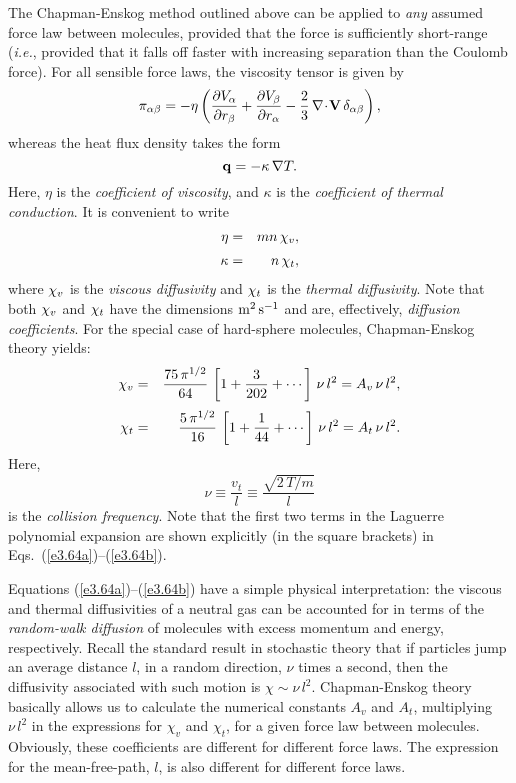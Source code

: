 The Chapman-Enskog method outlined above can be applied to {\em any}\/ assumed
force law between molecules, provided that the force is sufficiently short-range
({\em i.e.}, provided that it falls off faster with increasing 
separation than the Coulomb force). For all sensible force laws, the viscosity
tensor is given by
\begin{equation}\label{e3.61}
\pi_{\alpha\beta} =- \eta \left( \frac{\partial V_\alpha}{\partial r_\beta}
+ \frac{\partial V_\beta}{\partial r_\alpha} - \frac{2}{3}\,\nabla\!\cdot\!{\bf V}\,\delta_{\alpha\beta}
\right),
\end{equation}
whereas the heat flux density takes the form
\begin{equation}\label{e3.62}
{\bf q} = - \kappa\,\nabla T.
\end{equation}
Here, $\eta$ is the {\em coefficient of viscosity}, and $\kappa$ is the
{\em coefficient of thermal conduction}. It is convenient to write
\begin{eqnarray}
\eta &= &m n \,{\mit\chi}_v,\\[0.5ex]
\kappa& =& n\,{\mit\chi}_t,
\end{eqnarray}
where ${\mit\chi}_v$ is the {\em viscous diffusivity}\/ and ${\mit\chi}_t$
is the {\em thermal diffusivity}. Note that both ${\mit\chi}_v$ and
${\mit\chi}_t$ have the dimensions ${\rm m}^2\,{\rm s}^{-1}$ and are,
effectively, {\em diffusion coefficients}. For the special
case of hard-sphere molecules, Chapman-Enskog theory yields:
\begin{eqnarray}\label{e3.64a}
{\mit\chi}_v &=& \frac{75\,\pi^{1/2}}{64}\,\left[1+ \frac{3}{202}
+\cdots\right]\,\nu\,l^2 = A_v\,\nu\,l^2,\\[0.5ex]
{\mit\chi}_t &=& \frac{5\,\pi^{1/2}}{16}\,\left[
1+ \frac{1}{44}+\cdots\right]\,\nu\,l^2 = A_t\,\nu\,l^2.\label{e3.64b}
\end{eqnarray}
Here, 
\begin{equation}\label{e3.65}
\nu \equiv \frac{v_t}{l} \equiv \frac{\sqrt{2\,T/m}}{l}
\end{equation}
is the {\em collision frequency}. Note that the first two terms in the Laguerre
polynomial expansion are shown explicitly (in the square brackets) in Eqs.~(\ref{e3.64a})--(\ref{e3.64b}).

Equations (\ref{e3.64a})--(\ref{e3.64b}) have a simple physical interpretation: the viscous and thermal
diffusivities of a neutral gas can be accounted for in terms of the {\em
random-walk diffusion}\/ of molecules with excess momentum and energy, respectively.
Recall the standard result in stochastic theory that if particles
jump an average distance $l$, in a random direction, $\nu$ times a second, then
the diffusivity associated with such motion is $\chi\sim\nu\,l^2$.
Chapman-Enskog theory basically allows us to calculate the numerical constants
$A_v$ and $A_t$,
multiplying $\nu\,l^2$ in the expressions for $\chi_v$ and $\chi_t$,
 for a given force law between molecules.
Obviously, these coefficients are different for different force laws. The
expression for the 
mean-free-path, $l$,  is also different for different force laws. 

